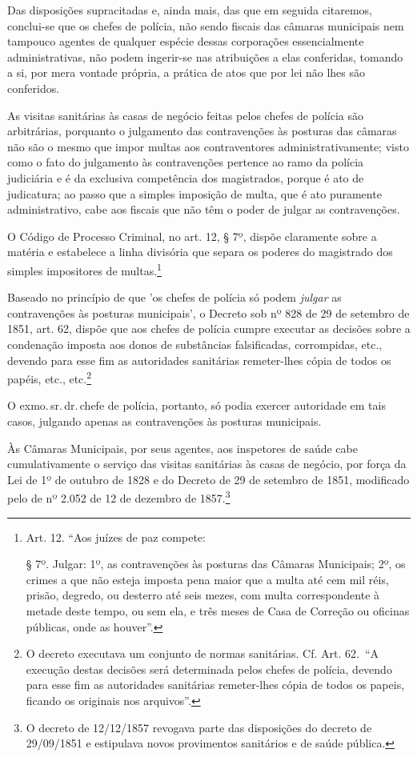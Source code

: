 Das disposições supracitadas e, ainda mais, das que em seguida
citaremos, conclui-se que os chefes de polícia, não sendo fiscais das
câmaras municipais nem tampouco agentes de qualquer espécie dessas
corporações essencialmente administrativas, não podem ingerir-se nas
atribuições a elas conferidas, tomando a si, por mera vontade própria, a
prática de atos que por lei não lhes são conferidos.

As visitas sanitárias às casas de negócio feitas pelos chefes de polícia
são arbitrárias, porquanto o julgamento das contravenções às posturas
das câmaras não são o mesmo que impor multas aos contraventores
administrativamente; visto como o fato do julgamento às contravenções
pertence ao ramo da polícia judiciária e é da exclusiva competência dos
magistrados, porque é ato de judicatura; ao passo que a simples
imposição de multa, que é ato puramente administrativo, cabe aos fiscais
que não têm o poder de julgar as contravenções.

O Código de Processo Criminal, no art. 12, § 7º, dispõe claramente sobre
a matéria e estabelece a linha divisória que separa os poderes do
magistrado dos simples impositores de multas.\footnote{Art. 12. ``Aos
  juízes de paz compete:

  § 7º. Julgar: 1º, as contravenções às posturas das Câmaras Municipais;
  2º, os crimes a que não esteja imposta pena maior que a multa até cem
  mil réis, prisão, degredo, ou desterro até seis mezes, com multa
  correspondente à metade deste tempo, ou sem ela, e três meses de Casa
  de Correção ou oficinas públicas, onde as houver''.}

Baseado no princípio de que 'os chefes de polícia só podem \emph{julgar}
as contravenções às posturas municipais', o Decreto sob nº 828 de 29 de
setembro de 1851, art. 62, dispõe que aos chefes de polícia cumpre
executar as decisões sobre a condenação imposta aos donos de substâncias
falsificadas, corrompidas, etc., devendo para esse fim as autoridades
sanitárias remeter-lhes cópia de todos os papéis, etc., etc.\footnote{
  O decreto executava um conjunto de normas sanitárias. Cf. Art. 62.~``A
  execução destas decisões será determinada pelos chefes de polícia,
  devendo para esse fim as autoridades sanitárias remeter-lhes cópia de
  todos os papeis, ficando os originais nos arquivos''.}

O exmo.\,sr.\,dr.\,chefe de polícia, portanto, só podia exercer autoridade
em tais casos, julgando apenas as contravenções às posturas municipais.

Às Câmaras Municipais, por seus agentes, aos inspetores de saúde cabe
cumulativamente o serviço das visitas sanitárias às casas de negócio,
por força da Lei de 1º de outubro de 1828 e do Decreto de 29 de setembro
de 1851, modificado pelo de nº 2.052 de 12 de dezembro de
1857.\footnote{O decreto de 12/12/1857 revogava parte das disposições
  do decreto de 29/09/1851 e estipulava novos provimentos sanitários e
  de saúde pública.}


